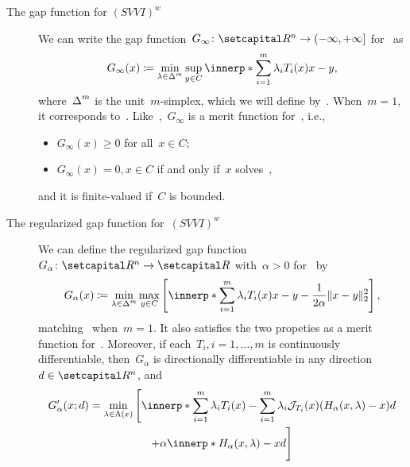 \documentclass[../../main]{subfiles}
\begin{document}
\begin{example} 
    \begin{description}
        \item[The gap function for $(SVVI)^w$~\cite{Charitha2010,Li2010}]
            We can write the gap function~$G_\infty \colon \setR^n \to (-\infty, +\infty]$ for~ as
            \begin{equation}
                G_\infty(x) \coloneqq \min_{\lambda \in \simplex^m} \sup_{y \in C} \innerp*{\sum_{i = 1}^{m} \lambda_i T_i(x)}{x - y}
                ,\end{equation}
            where~$\operatorname{\Delta}^m$ is the unit~$m$-simplex, which we will define by~.
            When~$m = 1$, it corresponds to~.
            Like~,~$G_\infty$ is a merit function for~, i.e.,
            \begin{itemize}
                \item $G_\infty(x) \ge 0$ for all~$x \in C$;
                \item $G_\infty(x) = 0, x \in C$ if and only if~$x$ solves~,
            \end{itemize}
            and it is finite-valued if~$C$ is bounded.
        \item[The regularized gap function for~$(SVVI)^w$~\cite{Charitha2010}]
            We can define the regularized gap function~$G_\alpha \colon \setR^n \to \setR$ with~$\alpha > 0$ for~ by
            \begin{equation} \label{eq:reg_gap_SVVIw}
                G_\alpha(x) \coloneqq \min_{\lambda \in \simplex^m} \max_{y \in C} \left[ \innerp*{\sum_{i = 1}^{m} \lambda_i T_i(x)}{x - y} - \frac{1}{2 \alpha} \norm{x - y}_2^2 \right]
                ,\end{equation}
            matching~ when~$m = 1$.
            It also satisfies the two propeties as a merit function for~.
            Moreover, if each~$T_i, i = 1, \dots, m$ is continuously differentiable, then~$G_\alpha$ is directionally differentiable in any direction~$d \in \setR^n$, and
            \begin{multline}
                G_\alpha'(x;d) = \min_{\lambda \in \Lambda(x)} \Bigg[ \innerp*{\sum_{i = 1}^{m} \lambda_i T_i(x) - \sum_{i = 1}^{m} \lambda_i \jdv{T_i}{x} (H_\alpha(x, \lambda) - x)}{d} \\
                + \alpha \innerp*{H_\alpha(x, \lambda) - x}{d} \Bigg]

\end{multline}
\end{description}
\end{example}
\end{document}
